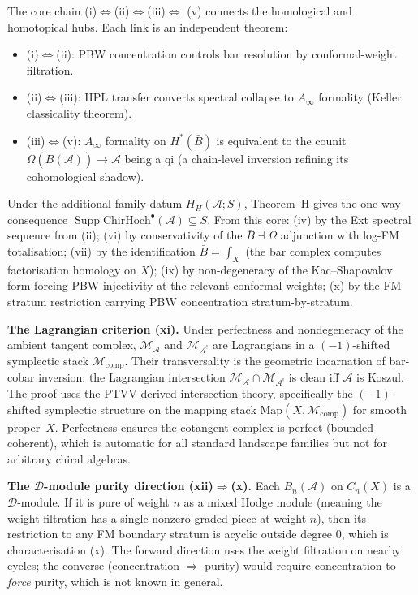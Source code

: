 \documentclass[11pt,reqno]{amsart}
\theoremstyle{definition}
\theoremstyle{remark}
\providecommand{\cA}{\mathcal{A}}
\providecommand{\cD}{\mathcal{D}}
\providecommand{\cM}{\mathcal{M}}
\providecommand{\barB}{\bar{B}}
\providecommand{\FM}{\overline{C}}
\providecommand{\ChirHoch}{\mathrm{ChirHoch}}
\numberwithin{equation}{section}
\begin{document}
\noindent
The core chain
(i)$\Leftrightarrow$(ii)$\Leftrightarrow$(iii)$\Leftrightarrow$%
(v) connects the homological and homotopical hubs.
Each link is an independent theorem:
\begin{itemize}[nosep]
\item (i)$\Leftrightarrow$(ii): PBW concentration controls
bar resolution by conformal-weight filtration.
\item (ii)$\Leftrightarrow$(iii): HPL transfer converts spectral
collapse to $A_\infty$ formality (Keller classicality theorem).
\item (iii)$\Leftrightarrow$(v): $A_\infty$ formality on
$H^*(\barB)$ is equivalent to the counit
$\Omega(\barB(\cA)) \to \cA$ being a qi (a chain-level
inversion refining its cohomological shadow).
\end{itemize}
Under the additional family datum \(H_H(\cA;S)\), Theorem~H gives the
one-way consequence
\(\operatorname{Supp}\ChirHoch^\bullet(\cA)\subseteq S\).
From this core: (iv) by the Ext spectral sequence from (ii);
(vi) by conservativity of the $\barB \dashv \Omega$ adjunction
with log-FM totalisation; (vii) by the identification
$\barB = \int_X$ (the bar complex computes factorisation
homology on $X$); (ix) by non-degeneracy of the
Kac--Shapovalov form forcing PBW injectivity at the relevant
conformal weights; (x) by the FM stratum restriction carrying
PBW concentration stratum-by-stratum.

\medskip\noindent\textbf{The Lagrangian criterion (xi).}\enspace
Under perfectness and nondegeneracy of the ambient tangent
complex, $\cM_\cA$ and $\cM_{\cA^!}$ are Lagrangians in a
$(-1)$-shifted symplectic stack $\cM_{\mathrm{comp}}$. Their
transversality is the geometric incarnation of bar-cobar
inversion: the Lagrangian intersection
$\cM_\cA \cap \cM_{\cA^!}$ is clean iff $\cA$ is Koszul. The
proof uses the PTVV derived intersection theory, specifically
the $(-1)$-shifted symplectic structure on the mapping stack
$\mathrm{Map}(X, \cM_{\mathrm{comp}})$ for smooth proper~$X$.
Perfectness ensures the cotangent complex is perfect (bounded
coherent), which is automatic for all standard landscape
families but not for arbitrary chiral algebras.

\medskip\noindent\textbf{The $\cD$-module purity direction
(xii)$\Rightarrow$(x).}\enspace
Each $\barB_n(\cA)$ on $\FM_n(X)$ is a $\cD$-module. If it is
pure of weight $n$ as a mixed Hodge module (meaning the weight
filtration has a single nonzero graded piece at weight $n$), then
its restriction to any FM boundary stratum is acyclic outside
degree $0$, which is characterisation (x). The forward direction
uses the weight filtration on nearby cycles; the converse
(concentration $\Rightarrow$ purity) would require concentration to
\emph{force} purity, which is not known in general.
\end{document}
